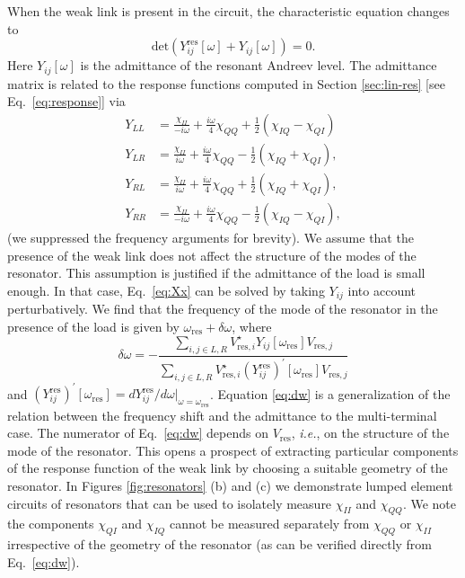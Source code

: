 \documentclass[aps,reprint,longbibliography, prb]{revtex4-2}
\begin{document}
When the weak link is present in the circuit, the characteristic equation changes to
\begin{equation}
\label{eq:Xx}
\mathrm{det}\left(Y^\mathrm{res}_{ij}[\omega] + Y_{ij}[\omega]\right) = 0.
\end{equation}
{Here $Y_{ij}[\omega]$ is the admittance of the resonant Andreev level.} The admittance matrix is related to the response functions computed in Section \ref{sec:lin-res} [see Eq.~\eqref{eq:response}] via 
\begin{subequations}
\label{eq:admit-1}
    \begin{align}
        Y_{LL}&= \frac{\chi_{II}}{-i\omega}+\frac{i\omega}{4}\chi_{QQ} + \frac{1}{2}\left(\chi_{IQ}-\chi_{QI}\right)\\
        Y_{LR}&= \frac{\chi_{II}}{i\omega}+\frac{i\omega}{4}\chi_{QQ} - \frac{1}{2}\left(\chi_{IQ}+\chi_{QI}\right),\\
        Y_{RL}&= \frac{\chi_{II}}{i\omega}+\frac{i\omega}{4}\chi_{QQ} + \frac{1}{2}\left(\chi_{IQ}+\chi_{QI}\right),\\
        Y_{RR}&= \frac{\chi_{II}}{-i\omega}+\frac{i\omega}{4}\chi_{QQ} - \frac{1}{2}\left(\chi_{IQ}-\chi_{QI}\right),        
    \end{align}
\end{subequations}
{(we suppressed the frequency arguments for brevity). We assume that the presence of the weak link does not affect the structure of the modes of the resonator.} This assumption is justified if the admittance of the load is small enough. In that case, Eq.~\eqref{eq:Xx} can be solved by taking $Y_{ij}$ into account perturbatively. We find that the frequency of the mode of the resonator in the presence of the load is given by $\omega_\mathrm{res} + \delta \omega$, where
\begin{equation}
\label{eq:dw}
\delta\omega =  - \frac{ \sum_{i,j\in L,R} V_{\mathrm{res},i}^\star Y_{ij}[\omega_\mathrm{res}] V_{\mathrm{res},j}}{\sum_{i,j\in L,R}  V_{\mathrm{res},i}^\star (Y^\mathrm{res}_{ij})^\prime[\omega_\mathrm{res}]V_{\mathrm{res},j}}
\end{equation}
and $(Y^\mathrm{res}_{ij})^\prime[\omega_\mathrm{res}] = dY_{ij}^\mathrm{res}/d\omega|_{\omega=\omega_\mathrm{res}}$. Equation \eqref{eq:dw} is a generalization of the relation between the frequency shift and the admittance \cite{devoret1989} to the multi-terminal case.
{The numerator of Eq.~\eqref{eq:dw} depends on $V_\mathrm{res}$, \textit{i.e.}, on the structure of the mode of the resonator. This opens a prospect of extracting particular components of the response function of the weak link by choosing a suitable geometry of the resonator.} In Figures \ref{fig:resonators} (b) and (c) we demonstrate lumped element circuits of resonators that can be used to isolately measure $\chi_{II}$ and $\chi_{QQ}$. We note the components $\chi_{QI}$ and $\chi_{IQ}$ cannot be measured separately from $\chi_{QQ}$ or $\chi_{II}$ irrespective of the geometry of the resonator (as can be verified directly from Eq.~\eqref{eq:dw}).
\end{document}
